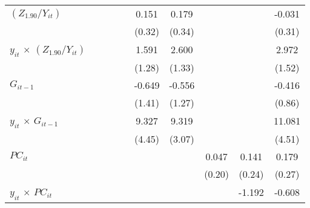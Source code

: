 \documentclass[12pt, a4paper]{article}
\begin{document}
\begin{table}
\begin{threeparttable}
{\begin{tabular}{l*{9}{c}}
				$(Z_{1.90}/Y_{it})$          &                     &                     &                     &                     &       0.151         &       0.179         &                     &                     &      -0.031         \\
				&                     &                     &                     &                     &      (0.32)         &      (0.34)         &                     &                     &      (0.31)         \\
				$y_{it}$ $\times$ $(Z_{1.90}/Y_{it})$&                     &                     &                     &                     &       1.591         &       2.600         &                     &                     &       2.972         \\
				&                     &                     &                     &                     &      (1.28)         &      (1.33)         &                     &                     &      (1.52)         \\
				$G_{it-1}$            &                     &                     &                     &                     &      -0.649         &      -0.556         &                     &                     &      -0.416         \\
				&                     &                     &                     &                     &      (1.41)         &      (1.27)         &                     &                     &      (0.86)         \\
				$y_{it}$ $\times$ $G_{it-1}$&                     &                     &                     &                     &       9.327\sym{*}  &       9.319\sym{**} &                     &                     &      11.081\sym{*}  \\
				&                     &                     &                     &                     &      (4.45)         &      (3.07)         &                     &                     &      (4.51)         \\
				$PC_{it}$                &                     &                     &                     &                     &                     &                     &       0.047         &       0.141         &       0.179         \\
				&                     &                     &                     &                     &                     &                     &      (0.20)         &      (0.24)         &      (0.27)         \\
				$y_{it}$ $\times$ $PC_{it}$ &                     &                     &                     &                     &                     &                     &                     &      -1.192         &      -0.608         \\

\end{tabular}}
\end{threeparttable}
\end{table}
\end{document}
